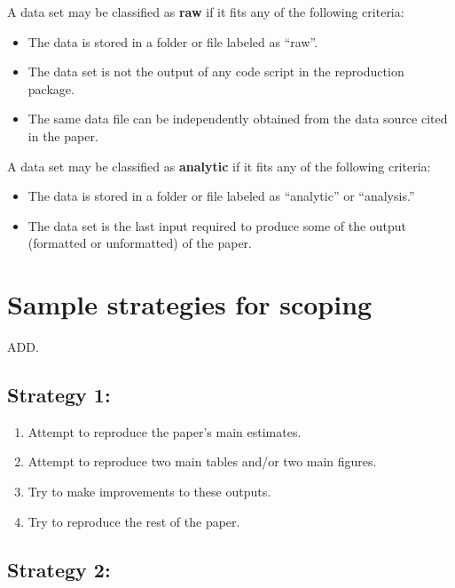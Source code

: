 \documentclass[]{book}
\providecommand{\tightlist}{%
  \setlength{\itemsep}{0pt}\setlength{\parskip}{0pt}}
\begin{document}
A data set may be classified as \textbf{raw} if it fits any of the following criteria:

\begin{itemize}
\tightlist
\item
  The data is stored in a folder or file labeled as ``raw''.\\
\item
  The data set is not the output of any code script in the reproduction package.\\
\item
  The same data file can be independently obtained from the data source cited in the paper.
\end{itemize}

A data set may be classified as \textbf{analytic} if it fits any of the following criteria:

\begin{itemize}
\tightlist
\item
  The data is stored in a folder or file labeled as ``analytic'' or ``analysis.''
\item
  The data set is the last input required to produce some of the output (formatted or unformatted) of the paper.
\end{itemize}

\hypertarget{sample-strategies-for-scoping}{%
\section{Sample strategies for scoping}\label{sample-strategies-for-scoping}}

ADD.

\hypertarget{strategy-1}{%
\subsection{Strategy 1:}\label{strategy-1}}

\begin{enumerate}
\def\labelenumi{\arabic{enumi}.}
\tightlist
\item
  Attempt to reproduce the paper's main estimates.
\item
  Attempt to reproduce two main tables and/or two main figures.
\item
  Try to make improvements to these outputs.
\item
  Try to reproduce the rest of the paper.
\end{enumerate}

\hypertarget{strategy-2}{%
\subsection{Strategy 2:}\label{strategy-2}}
\end{document}
